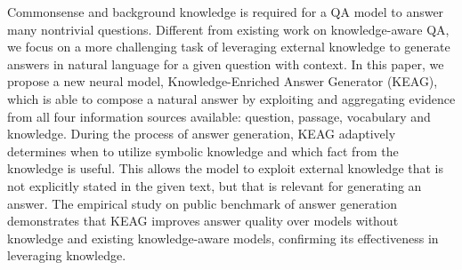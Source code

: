 Commonsense and background knowledge is required for a QA model to answer many nontrivial questions. Different from existing work on knowledge-aware QA, we focus on a more challenging task of leveraging external knowledge to generate answers in natural language for a given question with context. In this paper, we propose a new neural model, Knowledge-Enriched Answer Generator (KEAG), which is able to compose a natural answer by exploiting and aggregating evidence from all four information sources available: question, passage, vocabulary and knowledge. During the process of answer generation, KEAG adaptively determines when to utilize symbolic knowledge and which fact from the knowledge is useful. This allows the model to exploit external knowledge that is not explicitly stated in the given text, but that is relevant for generating an answer. The empirical study on public benchmark of answer generation demonstrates that KEAG improves answer quality over models without knowledge and existing knowledge-aware models, confirming its effectiveness in leveraging knowledge.
